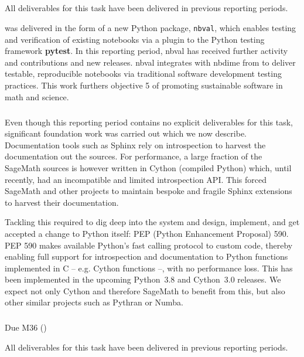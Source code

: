 \smallskip
\subparagraph{}
\label{UI@notebook-verification}

All deliverables for this task have been delivered in previous reporting periods.

 was delivered in the form of a new Python package, \texttt{nbval},
which enables testing and verification of existing notebooks via a plugin to the Python testing
framework \textbf{pytest}.
In this reporting period, nbval has received further activity and contributions and new releases.
nbval integrates with nbdime from  to deliver
testable, reproducible notebooks via traditional software development testing practices.
This work furthers \ODK objective 5 of promoting sustainable software in math and science.

\smallskip
\subparagraph{}
\label{UI@sage-sphinx}

Even though this reporting period contains no explicit deliverables
for this task, significant foundation work was carried out which we
now describe. Documentation tools such as Sphinx rely on introspection
to harvest the documentation out the sources. For performance, a large
fraction of the SageMath sources is however written in Cython
(compiled Python) which, until recently, had an incompatible and
limited introspection API. This forced SageMath and other projects to
maintain bespoke and fragile Sphinx extensions to harvest their
documentation.

Tackling this required to dig deep into the system and design,
implement, and get accepted a change to Python itself: PEP (Python
Enhancement Proposal) 590. PEP 590 makes available Python's fast
calling protocol to custom code, thereby enabling full support for
introspection and documentation to Python functions implemented in C
-- e.g. Cython functions --, with no performance loss. This has been
implemented in the upcoming Python~3.8 and Cython~3.0 releases. We
expect not only Cython and therefore SageMath to benefit from this,
but also other similar projects such as Pythran or Numba.

\smallskip
\subparagraph{} Due M36 ()
\label{UI@dynamic-inspect}

All deliverables for this task have been delivered in previous reporting periods.

